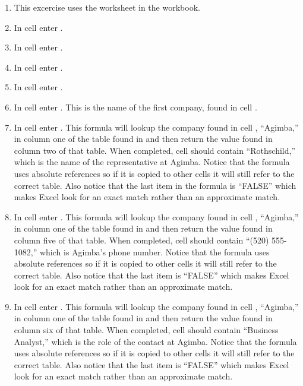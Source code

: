 \begin{enumerate}
	\item This excercise uses the  worksheet in the  workbook.
	\item In cell  enter .
	\item In cell  enter .
	\item In cell  enter .
	\item In cell  enter .
	\item In cell  enter . This is the name of the first company, found in cell .
	\item In cell  enter . This formula will lookup the company found in cell , ``Agimba,'' in column one of the table found in  and then return the value found in column two of that table. When completed, cell  should contain ``Rothschild,'' which is the name of the representative at Agimba. Notice that the formula uses absolute references so if it is copied to other cells it will still refer to the correct table. Also notice that the last item in the formula is ``FALSE'' which makes Excel look for an exact match rather than an approximate match.
	\item In cell  enter . This formula will lookup the company found in cell , ``Agimba,'' in column one of the table found in  and then return the value found in column five of that table. When completed, cell  should contain ``(520) 555-1082,'' which is Agimba's phone number.  Notice that the formula uses absolute references so if it is copied to other cells it will still refer to the correct table. Also notice that the last item is ``FALSE'' which makes Excel look for an exact match rather than an approximate match.
	\item In cell  enter . This formula will lookup the company found in cell , ``Agimba,'' in column one of the table found in  and then return the value found in column six of that table. When completed, cell  should contain ``Business Analyst,'' which is the role of the contact at Agimba.  Notice that the formula uses absolute references so if it is copied to other cells it will still refer to the correct table. Also notice that the last item is ``FALSE'' which makes Excel look for an exact match rather than an approximate match.
	

\end{enumerate}
